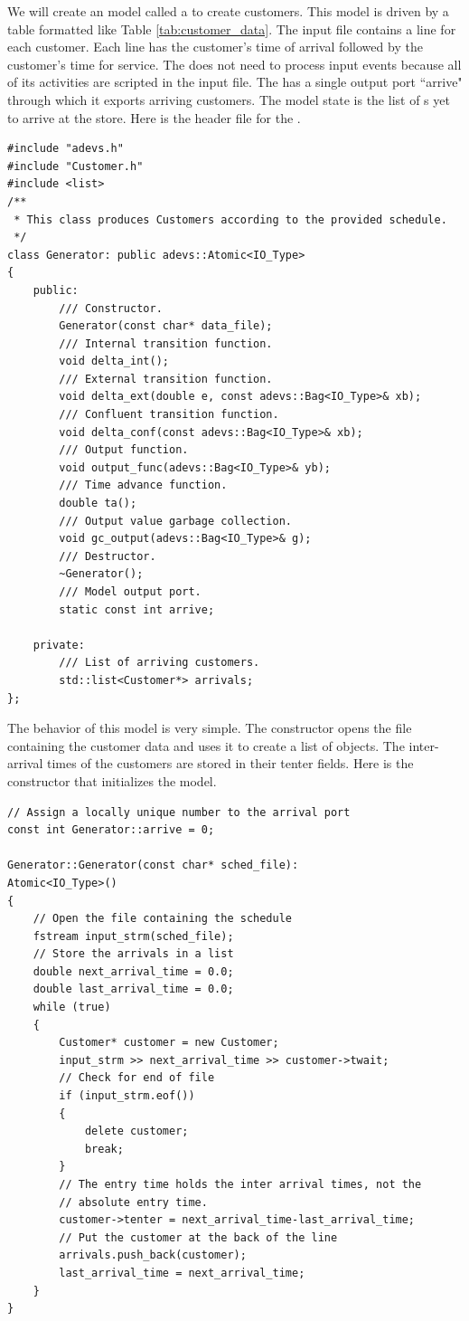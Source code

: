 We will create an  model called a  to create customers. This model is driven by a table formatted like Table \ref{tab:customer_data}. The input file contains a line for each customer. Each line has the customer's time of arrival followed by the customer's time for service. The  does not need to process input events because all of its activities are scripted in the input file. The  has a single output port ``arrive" through which it exports arriving customers. The model state is the list of s yet to arrive at the store. Here is the header file for the .
\begin{verbatim}
#include "adevs.h"
#include "Customer.h"
#include <list>
/**
 * This class produces Customers according to the provided schedule.
 */
class Generator: public adevs::Atomic<IO_Type> 
{
    public:
        /// Constructor.
        Generator(const char* data_file);
        /// Internal transition function.
        void delta_int();
        /// External transition function.
        void delta_ext(double e, const adevs::Bag<IO_Type>& xb);
        /// Confluent transition function.
        void delta_conf(const adevs::Bag<IO_Type>& xb);
        /// Output function.  
        void output_func(adevs::Bag<IO_Type>& yb);
        /// Time advance function.
        double ta();
        /// Output value garbage collection.
        void gc_output(adevs::Bag<IO_Type>& g);
        /// Destructor.
        ~Generator();
        /// Model output port.
        static const int arrive;

    private:    
        /// List of arriving customers.
        std::list<Customer*> arrivals;
}; 
\end{verbatim}

The behavior of this model is very simple. The constructor opens the file containing the customer data and uses it to create a list of  objects. The inter-arrival times of the customers are stored in their tenter fields. Here is the constructor that initializes the model.
\begin{verbatim}
// Assign a locally unique number to the arrival port
const int Generator::arrive = 0;

Generator::Generator(const char* sched_file):
Atomic<IO_Type>()
{
    // Open the file containing the schedule
    fstream input_strm(sched_file);
    // Store the arrivals in a list
    double next_arrival_time = 0.0;
    double last_arrival_time = 0.0;
    while (true)
    {
        Customer* customer = new Customer;
        input_strm >> next_arrival_time >> customer->twait;
        // Check for end of file
        if (input_strm.eof())
        {
            delete customer;
            break;
        }
        // The entry time holds the inter arrival times, not the
        // absolute entry time.
        customer->tenter = next_arrival_time-last_arrival_time;
        // Put the customer at the back of the line
        arrivals.push_back(customer);
        last_arrival_time = next_arrival_time;
    }
}
\end{verbatim}

